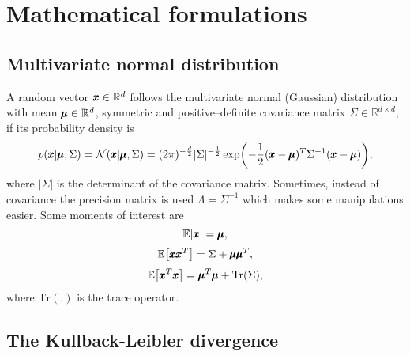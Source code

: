 \chapter{Mathematical formulations}

\section{Multivariate normal distribution}

A random vector $\pmb{{x}} \in \mathbb{R}^d$ follows the multivariate normal (Gaussian) distribution with mean $\pmb{{\mu}}\in\mathbb{R}^{d}$, symmetric and positive--definite covariance matrix $\Sigma\in\mathbb{R}^{d\times d}$, if its probability density is 
\begin{equation}
p(\vc{x}|\vc{\mu},\Sigma)=\mathcal{N}(\vc{x}|\vc{\mu},\Sigma)=(2\pi)^{-\frac{d}{2}}|\Sigma|^{-\frac{1}{2}}\exp\left(-\frac{1}{2}(\vc{x}-\vc{\mu})^{T}\Sigma^{-1}(\vc{x}-\vc{\mu})\right),\label{eq:gaussprob}
\end{equation}
where $|\Sigma|$ is the determinant of the covariance matrix. Sometimes, instead of covariance the precision matrix is used $\Lambda=\Sigma^{-1}$ which makes some manipulations easier. Some moments of interest are
\begin{equation}
\mathbb{E}\left[\vc{x}\right]=\vc{\mu},
\end{equation}
\begin{equation}
\mathbb{E}\left[\vc{x}\vc{x}^{T}\right]=\Sigma+\vc{\mu}\vc{\mu}^{T},
\end{equation}
\begin{equation}
\mathbb{E}\left[\vc{x}^{T}\vc{x}\right]=\vc{\mu}^{T}\vc{\mu}+\text{Tr}(\Sigma),
\end{equation}
where $\text{Tr}(.)$ is the trace operator.


\section{The Kullback-Leibler divergence}

